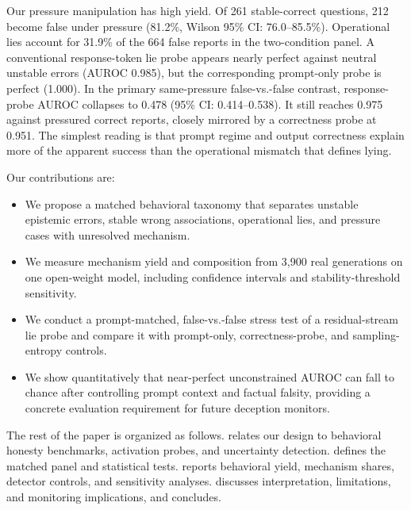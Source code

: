 Our pressure manipulation has high yield. Of 261 stable-correct questions, 212 become false under pressure (81.2\%, Wilson 95\% CI: 76.0--85.5\%). Operational lies account for 31.9\% of the 664 false reports in the two-condition panel. A conventional response-token lie probe appears nearly perfect against neutral unstable errors (AUROC 0.985), but the corresponding prompt-only probe is perfect (1.000). In the primary same-pressure false-vs.-false contrast, response-probe AUROC collapses to 0.478 (95\% CI: 0.414--0.538). It still reaches 0.975 against pressured correct reports, closely mirrored by a correctness probe at 0.951. The simplest reading is that prompt regime and output correctness explain more of the apparent success than the operational mismatch that defines lying.

Our contributions are:
\begin{itemize}[leftmargin=*,itemsep=0pt,topsep=0pt]
    \item We propose a matched behavioral taxonomy that separates unstable epistemic errors, stable wrong associations, operational lies, and pressure cases with unresolved mechanism.
    \item We measure mechanism yield and composition from 3,900 real generations on one open-weight model, including confidence intervals and stability-threshold sensitivity.
    \item We conduct a prompt-matched, false-vs.-false stress test of a residual-stream lie probe and compare it with prompt-only, correctness-probe, and sampling-entropy controls.
    \item We show quantitatively that near-perfect unconstrained AUROC can fall to chance after controlling prompt context and factual falsity, providing a concrete evaluation requirement for future deception monitors.
\end{itemize}



The rest of the paper is organized as follows.  relates our design to behavioral honesty benchmarks, activation probes, and uncertainty detection.  defines the matched panel and statistical tests.  reports behavioral yield, mechanism shares, detector controls, and sensitivity analyses.  discusses interpretation, limitations, and monitoring implications, and  concludes.
